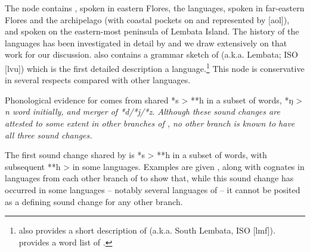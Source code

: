 \clearpage
{}
The  node contains ,
spoken in eastern Flores,
the  languages, spoken in far-eastern Flores
and the  archipelago (with coastal pockets on 
and  represented by  [aol]),
and  spoken on the eastern-most peninsula of Lembata Island.
The history of the  languages has been investigated
in detail by \citet{Fricke2019}
and we draw extensively on that work for our discussion.
\citet{Fricke2019} also contains a grammar sketch of  (a.k.a.
 Lembata; ISO [lvu]) which is the first detailed
description a  language.\footnote{ 
		\citet{Krauße2016} also provides a short description of   (a.k.a.
		South Lembata,  ISO [lmf]).
		\citet{Fricke2015b} provides a word list of .}
This node is conservative in several respects compared with other
 languages.

Phonological evidence for  comes from shared
*s > **h in a subset of words,
*ŋ > \it{n} word initially,
and merger of *d/*j/*z.
Although these sound changes are attested to some extent in other
branches of , no other branch is known to have all three sound changes.

The first sound change shared by  is *s >
**h in a subset of words,
with subsequent **h > {\0} in some languages.
Examples are given ,
along with cognates in languages from each other branch of
 to show that,
while this sound change has occurred in some languages -- notably
several languages of  -- it cannot be posited
as a defining sound change for any other branch.

